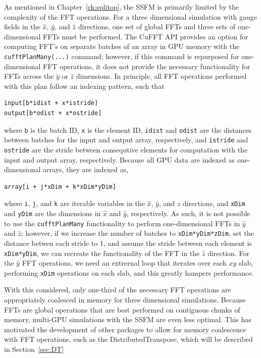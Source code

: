As mentioned in Chapter~\ref{ch:splitop}, the SSFM is primarily limited by the complexity of the FFT operations.
For a three dimensional simulation with gauge fields in the $\hat x$, $\hat y$, and $\hat z$ directions, one set of global FFTs and three sets of one-dimensional FFTs must be performed.
The CuFFT API provides an option for computing FFT's on separate batches of an array in GPU memory with the \texttt{cufftPlanMany(...)} command; however, if this command is repurposed for one-dimensional FFT operations, it does not provide the necessary functionality for FFTs across the $\hat y$ or $\hat z$ dimensions.
In principle, all FFT operations performed with this plan follow an indexing pattern, such that 

\begin{lstlisting}
input[b*idist + x*istride]
output[b*odist + x*ostride]
\end{lstlisting}

\noindent where \texttt{b} is the batch ID, \texttt{x} is the element ID, \texttt{idist} and \texttt{odist} are the distances between batches for the input and output array, respectively, and \texttt{istride} and \texttt{ostride} are the stride between consequtive elements for computation with the input and output array, respectively.
Because all GPU data are indexed as one-dimensional arrays, they are indexed as,

\begin{lstlisting}
array[i + j*xDim + k*xDim*yDim]
\end{lstlisting}

\noindent where \texttt{i}, \texttt{j}, and \texttt{k} are iterable variables in the $\hat x$, $\hat y$, and $\hat z$ directions, and \texttt{xDim} and \texttt{yDim} are the dimensions in $\hat x$ and $\hat y$, respectively.
As such, it is not possible to use the \texttt{cufftPlanMany} functionality to perform one-dimensional FFTs in $\hat y$ and $\hat z$; however, if we increase the number of batches to \texttt{xDim*yDim*zDim}, set the distance betwen each stride to 1, and assume the stride between each element is \texttt{xDim*yDim}, we can recreate the functionality of the FFT in the $\hat z$ direction.
For the $\hat y$ FFT operations, we need an extrernal loop that iterates over each $xy$ slab, performing \texttt{xDim} operations on each slab, and this greatly hampers performance.


With this considered, only one-third of the necessary FFT operations are appropriately coalesced in memory for three dimensional simulations.
Because FFTs are global operations that are best performed on contiguous chunks of memory, multi-GPU simulations with the SSFM are even less optimal.
This has motivated the development of other packages to allow for memory coalescence with FFT operations, such as the DistributedTranspose, which will be described in Section~\ref{sec:DT}

